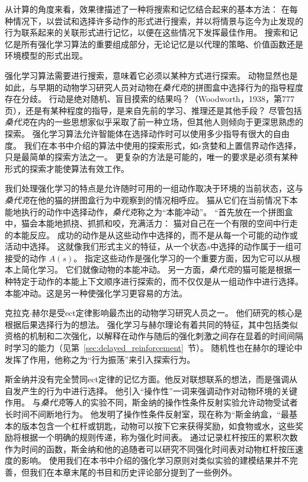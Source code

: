 从计算的角度来看，效果律描述了一种将搜索和记忆结合起来的基本方法：
在每种情况下，以尝试和选择许多动作的形式进行搜索，并以将情景与迄今为止发现的行为联系起来的关联形式进行记忆，以便在这些情况下发挥最佳作用。
搜索和记忆是所有强化学习算法的重要组成部分，无论记忆是以代理的策略、价值函数还是环境模型的形式出现。


强化学习算法需要进行搜索，意味着它必须以某种方式进行探索。
动物显然也是如此，与早期的动物学习研究人员对动物在\textit{桑代克}的拼图盒中选择行为的指导程度存在分歧。
行动是绝对随机、盲目摸索的结果吗？（Woodworth，1938，第777页），还是有某种程度的指导，是来自先前的学习、推理还是其他手段？
尽管包括\textit{桑代克}在内的一些思想家似乎采取了前一种立场，但其他人则倾向于更深思熟虑的探索。
强化学习算法允许智能体在选择动作时可以使用多少指导有很大的自由度。
我们在本书中介绍的算法中使用的探索形式，如$\epsilon$贪婪和上置信界动作选择，只是最简单的探索方法之一。
更复杂的方法是可能的，唯一的要求是必须有某种形式的探索才能使算法有效工作。



我们处理强化学习的特点是允许随时可用的一组动作取决于环境的当前状态，这与\textit{桑代克}在他的猫的拼图盒行为中观察到的情况相呼应。
猫从它们在当前情况下本能地执行的动作中选择动作，\textit{桑代克}称之为“本能冲动”。
“首先放在一个拼图盒中，猫会本能地抓挠、抓抓和咬，充满活力：
猫对自己在一个有限的空间中行走的本能反应。
成功的动作是从这些动作中选择的，而不是从每一个可能的动作或活动中选择。
这就像我们形式主义的特征，从一个状态$ s $中选择的动作属于一组可接受的动作 $ A(s) $。
指定这些动作是强化学习的一个重要方面，因为它可以从根本上简化学习。
它们就像动物的本能冲动。
另一方面，\textit{桑代克}的猫可能是根据一种特定于动作的本能上下文顺序进行探索的，而不仅仅是从一组动作中进行选择。
本能冲动。这是另一种使强化学习更容易的方法。


克拉克$\cdot$赫尔\cite{skinner2019behavior}是受ect定律影响最杰出的动物学习研究人员之一。
他们研究的核心是根据后果选择行为的想法。
强化学习与赫尔理论有着共同的特征，其中包括类似资格的机制和二次强化，以解释在动作与随后的强化刺激之间存在显着的时间间隔时学习的能力（见第~\ref{sec:delayed_reinforcement}~节）。
随机性也在赫尔的理论中发挥了作用，他称之为“行为振荡”来引入探索行为。


斯金纳并没有完全赞同ect定律的记忆方面。他反对联想联系的想法，而是强调从自发产生的行为中进行选择。
他引入“操作性”一词来强调动作对动物环境的关键作用。
与\textit{桑代克}等人的实验不同，斯金纳的操作性条件反射实验允许动物受试者长时间不间断地行为。
他发明了操作性条件反射室，现在称为“斯金纳盒，“最基本的版本包含一个杠杆或钥匙，动物可以按下它来获得奖励，如食物或水，这些奖励将根据一个明确的规则传递，称为强化时间表。
通过记录杠杆按压的累积次数作为时间的函数，斯金纳和他的追随者可以研究不同强化时间表对动物杠杆按压速度的影响。
使用我们在本书中介绍的强化学习原则对类似实验的建模结果并不完善，但我们在本章末尾的书目和历史评论部分提到了一些例外。


